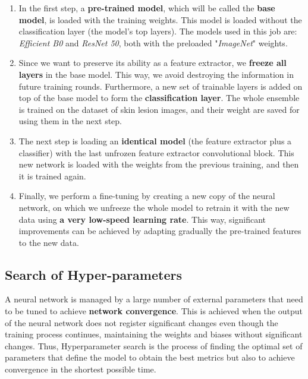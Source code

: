 \begin{enumerate}
    \label{ch:Transfer_learning}
    
    \item In the first step, a\textbf{ pre-trained model}, which will be called the \textbf{base model}, is loaded with the training weights. This model is loaded without the classification layer (the model's top layers). The models used in this job are: \textit{Efficient B0} and \textit{ResNet 50}, both with the preloaded "\textit{ImageNet}" weights. 
 
    \item Since we want to preserve its ability as a feature extractor, we \textbf{freeze all layers} in the base model.  This way, we avoid destroying the information in future training rounds. Furthermore, a new set of trainable layers is added on top of the base model to form the \textbf{classification layer}. The whole ensemble is trained on the dataset of skin lesion images, and their weight are saved for using them in the next step. 

    \item The next step is loading an \textbf{identical model} (the feature extractor plus a classifier) with the last unfrozen feature extractor convolutional block. This new network is loaded with the weights from the previous training, and then it is trained again.

    \item Finally, we perform a fine-tuning by creating a new copy of the neural network, on which we unfreeze the whole model to retrain it with the new data using \textbf{a very low-speed learning rate}. This way, significant improvements can be achieved by adapting gradually the pre-trained features to the new data.

\end{enumerate}

\subsection{Search of Hyper-parameters}

A neural network is managed by a large number of external parameters that need to be tuned to achieve \textbf{network convergence}. This is achieved when the output of the neural network does not register significant changes even though the training process continues, maintaining the weights and biases without significant changes. Thus, Hyperparameter search is the process of finding the optimal set of parameters that define the model to obtain the best metrics but also to achieve convergence in the shortest possible time.


